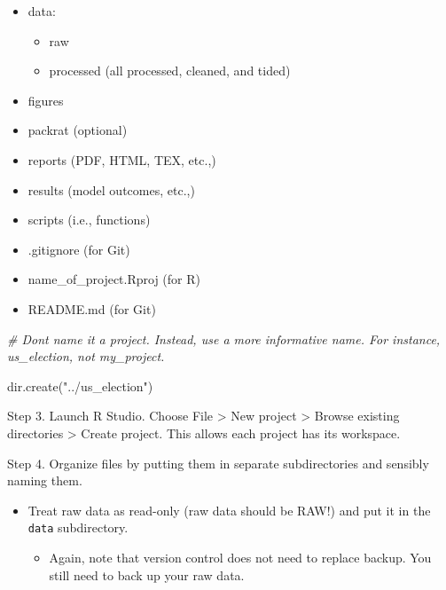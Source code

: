 \documentclass[
]{book}
\newenvironment{Shaded}{\begin{snugshade}}{\end{snugshade}}
\newcommand{\CommentTok}[1]{\textcolor[rgb]{0.56,0.35,0.01}{\textit{#1}}}
\newcommand{\FunctionTok}[1]{\textcolor[rgb]{0.00,0.00,0.00}{#1}}
\newcommand{\NormalTok}[1]{#1}
\newcommand{\StringTok}[1]{\textcolor[rgb]{0.31,0.60,0.02}{#1}}
\providecommand{\tightlist}{%
  \setlength{\itemsep}{0pt}\setlength{\parskip}{0pt}}
\begin{document}
\begin{itemize}
\tightlist
\item
  data:

  \begin{itemize}
  \tightlist
  \item
    raw
  \item
    processed (all processed, cleaned, and tided)
  \end{itemize}
\item
  figures
\item
  packrat (optional)
\item
  reports (PDF, HTML, TEX, etc.,)
\item
  results (model outcomes, etc.,)
\item
  scripts (i.e., functions)
\item
  .gitignore (for Git)
\item
  name\_of\_project.Rproj (for R)
\item
  README.md (for Git)
\end{itemize}

\begin{Shaded}
\begin{Highlighting}[]
\CommentTok{\# Don\textquotesingle{}t name it a project. Instead, use a more informative name. For instance, \textasciigrave{}us\_election\textasciigrave{}, not \textasciigrave{}my\_project.\textasciigrave{}}

\FunctionTok{dir.create}\NormalTok{(}\StringTok{"../us\_election"}\NormalTok{)}
\end{Highlighting}
\end{Shaded}

Step 3. Launch R Studio. Choose File \textgreater{} New project \textgreater{} Browse existing directories \textgreater{} Create project. This allows each project has its workspace.

Step 4. Organize files by putting them in separate subdirectories and sensibly naming them.

\begin{itemize}
\item
  Treat raw data as read-only (raw data should be RAW!) and put it in the \texttt{data} subdirectory.

  \begin{itemize}
  \tightlist
  \item
    Again, note that version control does not need to replace backup. You still need to back up your raw data.
  \end{itemize}
\end{itemize}
\end{document}
